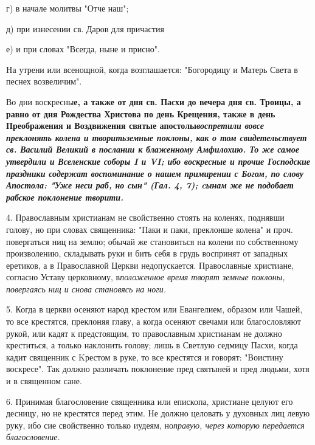 г)  в начале молитвы "Отче наш";

д)  при изнесении св. Даров для причастия 

е) и при словах "Всегда, ныне и присно". 

Hа утрени или всенощной, когда возглашается: "Богородицу и Матерь Света в песнех возвеличим". 



Во дни воскресны\bfseries е\normalfont{}, а также от дня св. Пасхи до вечера дня св. Троицы, а равно от дня Рождества Христова по день Крещения, также в день Преображения и Воздвижения святые апостолы\itshape  воспретил\normalfont{}и вовсе преклонять колена и творить\itshape  земны\normalfont{}\bfseries е\normalfont{} поклоны, как о том свидетельствует св. Василий Великий в послании к блаженному Амфилохию. То же самое утвердили и Вселенские соборы I и VI; ибо воскресные и прочие Господские праздники содержат воспоминание о нашем примирении с Богом, по слову Апостола: "Уже неси раб, но сын\itshape "\normalfont{} (Гал. 4, 7); cынам же не подобает рабское поклонение творити. 



4. Православным христианам не свойственно стоять на коленях, поднявши голову, но при словах священника: "Паки и паки, преклонше колена" и проч. повергаться ниц на землю; обычай же становиться на колени по собственному произволению, складывать руки и бить себя в грудь воспринят от западных еретиков, а в Православной Церкви недопускается. Православные христиане, согласно Уставу церковному, в\itshape  положенно\normalfont{}е время творят земные поклоны, повергаясь ниц и снова становясь на ноги. 



5. Когда в церкви осеняют народ крестом или Евангелием, образом или Чашей, то все крестятся, преклоняя главу, а когда осеняют свечами или благословляют рукой, или кадят к предстоящим, то православным христианам не должно креститься, а только наклонить голову; лишь в Светлую седмицу Пасхи, когда кадит священник с Kрестом в руке, то все крестятся и говорят: "Воистину воскресе". Так должно различать поклонение пред святыней и пред людьми, хотя и в священном сане. 



6. Принимая благословение священника или епископа, христиане целуют его десницу, но не крестятся перед этим. Не должно целовать у духовных лиц левую руку, ибо сие свойственно только иудеям, но\itshape  праву\normalfont{}ю, через которую передается благословение. 



